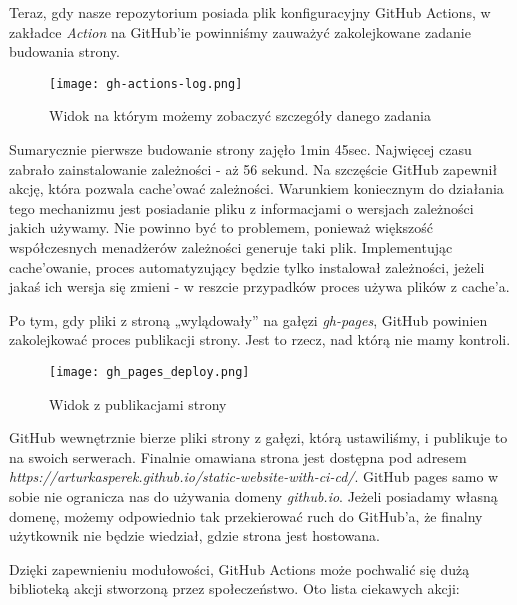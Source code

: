 \par
Teraz, gdy nasze repozytorium posiada plik konfiguracyjny GitHub Actions, w zakładce \textit{Action} na GitHub'ie powinniśmy zauważyć zakolejkowane zadanie budowania strony.
\begin{figure}[htbp]
  \centering
  \texttt{[image: gh-actions-log.png]}
  \caption{Widok na którym możemy zobaczyć szczegóły danego zadania}
  \label{fig:gh_actions_log}
\end{figure}
Sumarycznie pierwsze budowanie strony zajęło 1min 45sec. Najwięcej czasu zabrało zainstalowanie zależności - aż 56 sekund. Na szczęście GitHub zapewnił akcję, która pozwala cache'ować zależności. Warunkiem koniecznym do działania tego mechanizmu jest posiadanie pliku z informacjami o wersjach zależności jakich używamy. Nie powinno być to problemem, ponieważ większość współczesnych menadżerów zależności generuje taki plik. Implementując cache'owanie, proces automatyzujący będzie tylko instalował zależności, jeżeli jakaś ich wersja się zmieni - w reszcie przypadków proces używa plików z cache'a.
\par
Po tym, gdy pliki z stroną „wylądowały” na gałęzi \textit{gh-pages}, GitHub powinien zakolejkować proces publikacji strony. Jest to rzecz, nad którą nie mamy kontroli.
\begin{figure}[htbp]
  \centering
  \texttt{[image: gh\_pages\_deploy.png]}
  \caption{Widok z publikacjami strony}
  \label{fig:gh_pages_deploy}
\end{figure}
\par
GitHub wewnętrznie bierze pliki strony z gałęzi, którą ustawiliśmy, i publikuje to na swoich serwerach. Finalnie omawiana strona jest dostępna pod adresem \textit{https://arturkasperek.github.io/static-website-with-ci-cd/}. GitHub pages samo w sobie nie ogranicza nas do używania domeny \textit{github.io}. Jeżeli posiadamy własną domenę, możemy odpowiednio tak przekierować ruch do GitHub'a, że finalny użytkownik nie będzie wiedział, gdzie strona jest hostowana.
\par
Dzięki zapewnieniu modułowości, GitHub Actions może pochwalić się dużą biblioteką akcji stworzoną przez społeczeństwo. Oto lista ciekawych akcji:
